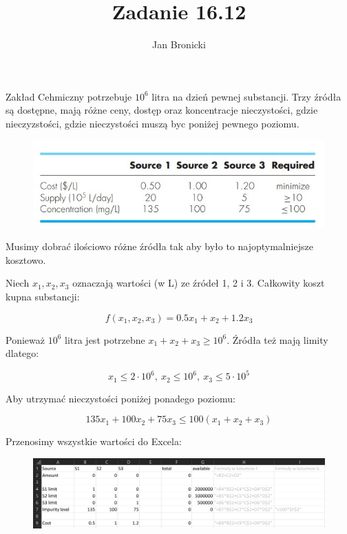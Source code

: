 \documentclass{article}
\title{Zadanie 16.12}
\author{Jan Bronicki}
\date{}
\begin{document}
\maketitle


Zakład Cehmiczny potrzebuje $10^{6}$ litra na dzień pewnej substancji. Trzy źródła są dostępne, mają różne ceny, dostęp oraz koncentracje nieczystości, gdzie nieczyzstości, gdzie nieczystości muszą byc poniżej pewnego poziomu.


\begin{figure}[h!]
    \centering
    \includegraphics[scale=0.75]{sources.jpg}
\end{figure}


Musimy dobrać ilościowo różne źródła tak aby było to najoptymalniejsze kosztowo.

Niech $x_{1}, x_{2}, x_{3}$ oznaczają wartości (w L) ze źródeł 1, 2 i 3. Całkowity koszt kupna substancji:

$$
    f(x_{1}, x_{2}, x_{3})=0.5x_{1} + x_{2} + 1.2x_{3}
$$

Ponieważ $10^{6}$ litra jest potrzebne $x_{1} + x_{2} + x_{3} \geq 10^{6}$. Źródła też mają limity dlatego:

$$
    x_{1} \leq 2\cdot 10^{6}, \ x_{2} \leq 10^{6}, \ x_{3} \leq 5\cdot 10^{5}
$$

Aby utrzymać nieczystości poniżej ponadego poziomu:

$$
    135x_{1}+100x_{2}+75x_{3} \leq 100(x_{1}+x_{2}+x_{3})
$$

\newpage

Przenosimy wszystkie wartości do Excela:

\begin{figure}[h!]
    \hspace{-6em}
    \includegraphics[scale=0.5]{przed_arkusz.jpg}
\end{figure}
\end{document}
